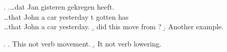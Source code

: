 \documentclass{article}
\begin{document}
\ex. 
\ag.\ldots dat Jan  gisteren   gekregen heeft.\\
\ldots that John {a \hspace*{1em} car}  yesterday t gotten has \\
\ldots that John a car yesterday.
\addtolength{\extraexheight}{1ex}
\b.   did this move from ?
\b. Another example.

\ex.
\a. This  not  verb movement.
\b. It   not  verb lowering.
\end{document}
